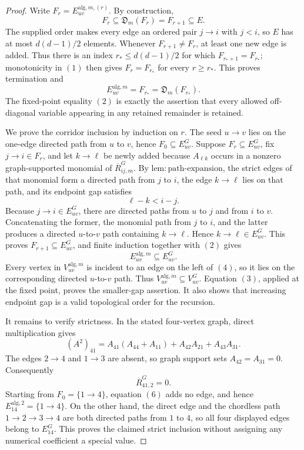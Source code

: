 \documentclass{article}
\begin{document}
\begin{proof}
Write \(F_r=E_{uv}^{\mathrm{alg},m,(r)}\).  By construction,
\[
 F_r\subseteq\mathfrak D_m(F_r)=F_{r+1}\subseteq E.
\tag{1}
\]
The supplied order makes every edge an ordered pair \(j\to i\) with \(j<i\), so \(E\) has at most \(d(d-1)/2\) elements.  Whenever \(F_{r+1}\ne F_r\), at least one new edge is added.  Thus there is an index \(r_*\le d(d-1)/2\) for which \(F_{r_*+1}=F_{r_*}\); monotonicity in \((1)\) then gives \(F_r=F_{r_*}\) for every \(r\ge r_*\).  This proves termination and
\[
 E_{uv}^{\mathrm{alg},m}=F_{r_*}=\mathfrak D_m(F_{r_*}).
\tag{2}
\]
The fixed-point equality \((2)\) is exactly the assertion that every allowed off-diagonal variable appearing in any retained remainder is retained.

We prove the corridor inclusion by induction on \(r\).  The seed \(u\to v\) lies on the one-edge directed path from \(u\) to \(v\), hence \(F_0\subseteq E_{uv}^{G}\).  Suppose \(F_r\subseteq E_{uv}^{G}\), fix \(j\to i\in F_r\), and let \(k\to\ell\) be newly added because \(A_{\ell k}\) occurs in a nonzero graph-supported monomial of \(\overline R^{G}_{ij,m}\).  By \(\mathrm{lem{:}path\mbox{-}expansion}\), the strict edges of that monomial form a directed path from \(j\) to \(i\), the edge \(k\to\ell\) lies on that path, and its endpoint gap satisfies
\[
 \ell-k<i-j.
\tag{3}
\]
Because \(j\to i\in E_{uv}^{G}\), there are directed paths from \(u\) to \(j\) and from \(i\) to \(v\).  Concatenating the former, the monomial path from \(j\) to \(i\), and the latter produces a directed \(u\)-to-\(v\) path containing \(k\to\ell\).  Hence \(k\to\ell\in E_{uv}^{G}\).  This proves \(F_{r+1}\subseteq E_{uv}^{G}\), and finite induction together with \((2)\) gives
\[
 E_{uv}^{\mathrm{alg},m}\subseteq E_{uv}^{G}.
\tag{4}
\]
Every vertex in \(V_{uv}^{\mathrm{alg},m}\) is incident to an edge on the left of \((4)\), so it lies on the corresponding directed \(u\)-to-\(v\) path.  Thus \(V_{uv}^{\mathrm{alg},m}\subseteq V_{uv}^{G}\).  Equation \((3)\), applied at the fixed point, proves the smaller-gap assertion.  It also shows that increasing endpoint gap is a valid topological order for the recursion.

It remains to verify strictness.  In the stated four-vertex graph, direct multiplication gives
\[
 (A^2)_{41}
 =A_{41}(A_{44}+A_{11})+A_{42}A_{21}+A_{43}A_{31}.
\tag{5}
\]
The edges \(2\to4\) and \(1\to3\) are absent, so graph support sets \(A_{42}=A_{31}=0\).  Consequently
\[
 \overline R^{G}_{41,2}=0.
\tag{6}
\]
Starting from \(F_0=\{1\to4\}\), equation \((6)\) adds no edge, and hence \(E_{14}^{\mathrm{alg},2}=\{1\to4\}\).  On the other hand, the direct edge and the chordless path \(1\to2\to3\to4\) are both directed paths from \(1\) to \(4\), so all four displayed edges belong to \(E_{14}^{G}\).  This proves the claimed strict inclusion without assigning any numerical coefficient a special value.
\end{proof}
\end{document}
